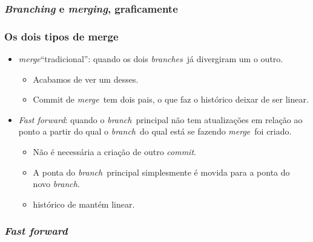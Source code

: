\documentclass{beamer}
\newcommand{\branch}{\emph{branch}}
\newcommand{\branches}{\emph{branches}}
\newcommand{\merge}{\emph{merge}}
\newcommand{\commit}{\emph{commit}}
\begin{document}
\begin{frame}
  \frametitle{\emph{Branching} e \emph{merging}, graficamente}
  \begin{figure}[h]
    \begin{center}
    \end{center}
    \label{fig:git-branch-merge}
  \end{figure}
\end{frame}

\begin{frame}
  \frametitle{Os dois tipos de merge}
  \begin{itemize}
    \item<1-> \merge ``tradicional'': quando os dois \branches\ já divergiram um o outro.
      \begin{itemize}
        \item Acabamos de ver um desses.
        \item Commit de \merge\ tem dois pais, o que faz o histórico
          deixar de ser linear.
      \end{itemize}
    \item<2-> \emph{Fast forward}: quando o \branch\ principal não tem
      atualizações em relação ao ponto a partir do qual o \branch\ do
      qual está se fazendo \merge\ foi criado.
      \begin{itemize}
        \item Não é necessária a criação de outro \commit.
        \item A ponta do \branch\ principal simplesmente é movida para a
          ponta do novo \branch .
        \item histórico de mantém linear.
      \end{itemize}
  \end{itemize}
\end{frame}

\begin{frame}
  \frametitle{\emph{Fast forward}}
  \begin{figure}[h]
    \begin{center}
    \end{center}
    \label{fig:fast-forward}
  \end{figure}
\end{frame}
\end{document}
